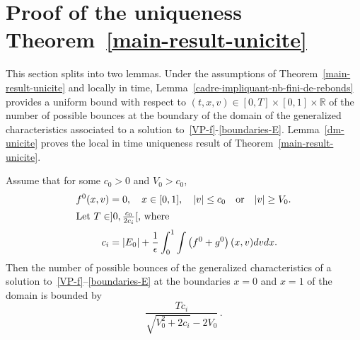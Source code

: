 \documentclass[AHL,Unicode,longabstracts,published]{cedram}
\newcommand{\R}{\mathbb{R}}
\begin{document}
\section{Proof of the uniqueness Theorem~\ref{main-result-unicite}}\label{pf-main-result-unicite}

This section splits into two lemmas. Under the assumptions of Theorem~\ref{main-result-unicite} and locally in time, Lemma~\ref{cadre-impliquant-nb-fini-de-rebonds} provides a uniform bound with respect to $(t,x,v)\in [0,T] \times [0,1] \times \R $ of the number of possible bounces at the boundary of the domain of the generalized characteristics associated to a solution to~\eqref{VP-f}-\eqref{boundaries-E}. Lemma~\ref{dm-unicite} proves the local in time uniqueness result of Theorem~\ref{main-result-unicite}.

\begin{lemm}\label{cadre-impliquant-nb-fini-de-rebonds}
Assume that for some $c_0>0$ and $V_0>c_0$,
\begin{align}
f^0(x,v) &= 0,\quad x\in [0,1],\quad |v| \leq c_0 \quad \text{or} \quad |v| \geq V_0.\label{troncature2-f0}
\\
\intertext{Let $T\in ] 0,\tfrac{c_0}{2c_i}[$, where}
c_i &= |E_0| + \frac{1}{\epsilon } \int_0^1 \int \left(f^0+g^0\right)(x,v)dvdx.\label{restriction-on-T}
\end{align}
Then the number of possible bounces of the generalized characteristics of a solution to~\eqref{VP-f}--\eqref{boundaries-E} at the boundaries $x=0$ and $x=1$ of the domain is bounded by
\[
\frac{Tc_i}{\sqrt{V_0^2+2c_i}-2V_0} \,.
\]
\end{lemm}
\end{document}
